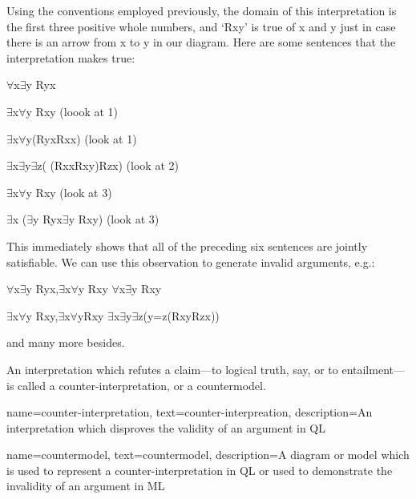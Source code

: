 Using the conventions employed previously, the domain of this interpretation is the first three positive whole numbers, and ‘Rxy’ is true of x and y just in case there is an arrow from x to y in our diagram. Here are some sentences that the interpretation makes true:
\begin{earg}
\item[]$\forall$x$\exists$y Ryx
\item[]$\exists$x$\forall$y Rxy (loook at 1)
\item[]$\exists$x$\forall$y(Ryx\eiff Rxx)  (look at 1)
\item[]$\exists$x$\exists$y$\exists$z( (\enot Rxx\eand Rxy)\eand Rzx) (look at 2)
\item[]$\exists$x$\forall$y \enot Rxy (look at 3)
\item[]$\exists$x ($\exists$y Ryx\eand \enot $\exists$y Rxy) (look at 3)
\end{earg}
This immediately shows that all of the preceding six sentences are jointly satisfiable. We can use this observation to generate invalid arguments, e.g.:
\begin{earg}
\item[]$\forall$x$\exists$y Ryx,$\exists$x$\forall$y Rxy \therefore $\forall$x$\exists$y Rxy
\item[]$\exists$x$\forall$y Rxy,$\exists$x$\forall$y\enot Rxy \therefore \enot $\exists$x$\exists$y$\exists$z(\enot y=z\eand (Rxy\eand Rzx))
\item[]and many more besides.
\end{earg}

An interpretation which refutes a claim—to logical truth, say, or to entailment—is called a \gls{counter-interpretation}, or a \gls{countermodel}.


{
name={counter-interpretation},
text={counter-interpreation},
description={An interpretation which disproves the validity of an argument in QL}
}

{
name={countermodel},
text={countermodel},
description={A diagram or model which is used to represent a counter-interpretation in QL or used to demonstrate the invalidity of an argument in ML}
}


